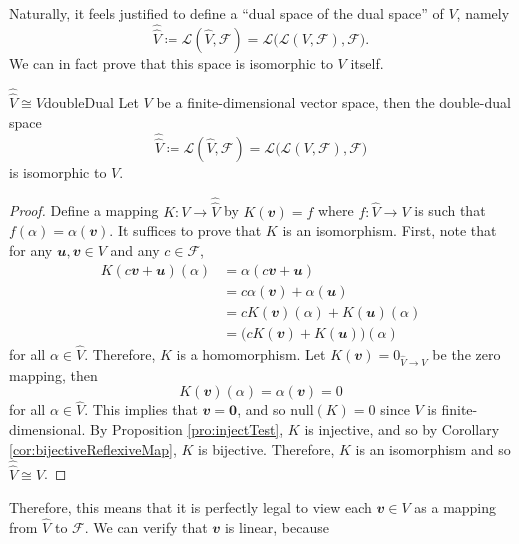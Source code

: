 \documentclass[math, code]{amznotes}
\theoremstyle{remark}
\newcommand{\zero}{\mathbf{0}}
\begin{document}
Naturally, it feels justified to define a ``dual space of the dual space'' of $V$, namely 
\begin{equation*}
    \hat{\hat{V}} \coloneqq \mathcal{L}\left(\hat{V}, \mathcal{F}\right) = \mathcal{L}\bigl(\mathcal{L}(V, \mathcal{F}), \mathcal{F}\bigr).
\end{equation*}
We can in fact prove that this space is isomorphic to $V$ itself. 
\begin{probox}{$\hat{\hat{V}} \cong V$}{doubleDual}
    Let $V$ be a finite-dimensional vector space, then the double-dual space 
    \begin{equation*}
        \hat{\hat{V}} \coloneqq \mathcal{L}\left(\hat{V}, \mathcal{F}\right) = \mathcal{L}\bigl(\mathcal{L}(V, \mathcal{F}), \mathcal{F}\bigr)
    \end{equation*}
    is isomorphic to $V$.
    \tcblower
    \begin{proof}
        Define a mapping $K \colon V \to \hat{\hat{V}}$ by $K(\mathbfit{v}) = f$ where $f \colon \hat{V} \to V$ is such that $f(\alpha) = \alpha(\mathbfit{v})$. It suffices to prove that $K$ is an isomorphism. First, note that for any $\mathbfit{u}, \mathbfit{v} \in V$ and any $c \in \mathcal{F}$,
        \begin{align*}
            K(c\mathbfit{v} + \mathbfit{u})(\alpha) & = \alpha(c\mathbfit{v} + \mathbfit{u}) \\
            & = c\alpha(\mathbfit{v}) + \alpha(\mathbfit{u}) \\
            & = cK(\mathbfit{v})(\alpha) + K(\mathbfit{u})(\alpha) \\
            & = \bigl(cK(\mathbfit{v}) + K(\mathbfit{u})\bigr)(\alpha)
        \end{align*}
        for all $\alpha \in \hat{V}$. Therefore, $K$ is a homomorphism. Let $K(\mathbfit{v}) = 0_{\hat{V} \to V}$ be the zero mapping, then 
        \begin{equation*}
            K(\mathbfit{v})(\alpha) = \alpha(\mathbfit{v}) = 0
        \end{equation*}
        for all $\alpha \in \hat{V}$. This implies that $\mathbfit{v} = \zero$, and so $\mathrm{null}(K) = 0$ since $V$ is finite-dimensional. By Proposition \ref{pro:injectTest}, $K$ is injective, and so by Corollary \ref{cor:bijectiveReflexiveMap}, $K$ is bijective. Therefore, $K$ is an isomorphism and so $\hat{\hat{V}} \cong V$.
    \end{proof}
\end{probox}
Therefore, this means that it is perfectly legal to view each $\mathbfit{v} \in V$ as a mapping from $\hat{V}$ to $\mathcal{F}$. We can verify that $\mathbfit{v}$ is linear, because
\end{document}
